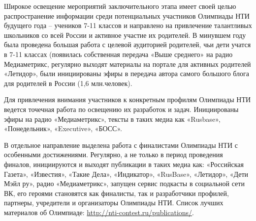 Широкое освещение мероприятий заключительного этапа имеет своей целью распространение информации среди потенциальных участников Олимпиады НТИ будущего года – учеников 7-11 классов и направлено на привлечение талантливых школьников со всей России и активное участие их родителей. В минувшем году была проведена большая работа с целевой аудиторией родителей, чьи дети учатся в 7-11 классах (появилась собственная передача «Выше среднего» на радио Медиаметрикс, регулярно выходят материалы на портале для активных родителей «Летидор», были инициированы эфиры в передача автора самого большого блога для родителей в России (1,6 млн.человек). 

Для привлечения внимания участников к конкретным профилям Олимпиады НТИ ведется точечная работа по освещению их разработок и задач. Инициированы эфиры на радио «Медиаметрикс», тексты в таких медиа как «Rusbase», «Понедельник», «Executive», «БОСС».

В отдельное направление выделена работа с финалистами Олимпиады НТИ с особенными достижениями. Регулярно, а не только в период проведения финалов, инициируются и выходят публикации в таких медиа как: «Российская Газета», «Известия», «Такие Дела», «Индикатор», «RusBase», «Летидор», «Дети Мэйл ру», радио «Медиаметрикс», запущен сервис подкасты в социальной сети ВК, его героями становятся как финалисты, так и разработчики профилей, партнеры, учредители и организаторы Олимпиады НТИ. 
Список лучших материалов об Олимпиаде: \url{http://nti-contest.ru/publications/}.
